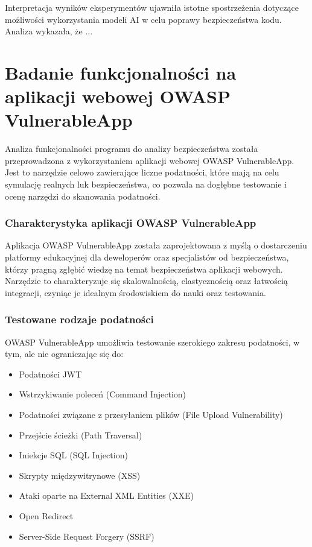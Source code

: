 Interpretacja wyników eksperymentów ujawniła istotne spostrzeżenia dotyczące możliwości wykorzystania modeli AI w celu poprawy bezpieczeństwa kodu. Analiza wykazała, że ...


\chapter{Badanie funkcjonalności na aplikacji webowej OWASP VulnerableApp}
\label{sec:badania_na_aplikacji_webowej_owasp}

Analiza funkcjonalności programu do analizy bezpieczeństwa została przeprowadzona z wykorzystaniem aplikacji webowej OWASP VulnerableApp. Jest to narzędzie celowo zawierające liczne podatności, które mają na celu symulację realnych luk bezpieczeństwa, co pozwala na dogłębne testowanie i ocenę narzędzi do skanowania podatności.

\subsection{Charakterystyka aplikacji OWASP VulnerableApp}
Aplikacja OWASP VulnerableApp została zaprojektowana z myślą o dostarczeniu platformy edukacyjnej dla deweloperów oraz specjalistów od bezpieczeństwa, którzy pragną zgłębić wiedzę na temat bezpieczeństwa aplikacji webowych. Narzędzie to charakteryzuje się skalowalnością, elastycznością oraz łatwością integracji, czyniąc je idealnym środowiskiem do nauki oraz testowania.

\subsection{Testowane rodzaje podatności}
OWASP VulnerableApp umożliwia testowanie szerokiego zakresu podatności, w tym, ale nie ograniczając się do:

\begin{itemize}
    \item Podatności JWT
    \item Wstrzykiwanie poleceń (Command Injection)
    \item Podatności związane z przesyłaniem plików (File Upload Vulnerability)
    \item Przejście ścieżki (Path Traversal)
    \item Iniekcje SQL (SQL Injection)
    \item Skrypty międzywitrynowe (XSS)
    \item Ataki oparte na External XML Entities (XXE)
    \item Open Redirect
    \item Server-Side Request Forgery (SSRF)
\end{itemize}

